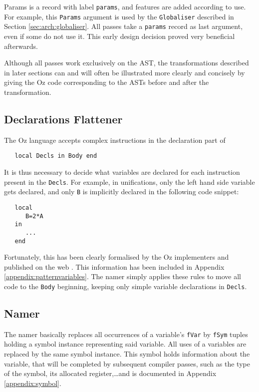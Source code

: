 \documentclass[a4paper]{memoir}
\begin{document}
Params is a record with label \lstinline!params!, and features are added
according to use. For example, this \lstinline!Params! argument is used by
the \lstinline!Globaliser! described in Section \ref{sec:arch:globaliser}. All
passes take a \lstinline!params! record as last argument, even if some do not use it. 
This early design decision proved very beneficial afterwards.


Although all passes work exclusively on the AST, the transformations described in later sections can and will often be illustrated more clearly and concisely by giving the Oz code corresponding to the ASTs before and after the transformation. 

\subsection{Declarations Flattener}\label{sec:arch:declsflattener}
The Oz language accepts complex instructions in the declaration part of
\begin{lstlisting}
   local Decls in Body end
\end{lstlisting}
 It is thus necessary to decide what variables are declared for each instruction present in the \lstinline!Decls!. 
For example, in unifications, only the left hand side variable gets declared,
and only \lstinline!B! is implicitly declared in the following code snippet:
\begin{lstlisting}
   local
      B=2*A
   in
      ...
   end
\end{lstlisting}
Fortunately, this has been clearly formalised by the Oz implementers and published on the web \cite{BaseLang}. This information has been included in Appendix \ref{appendix:patternvariables}. The namer simply applies these rules to move all code to the \lstinline!Body! beginning, keeping only simple variable declarations in \lstinline!Decls!.

\subsection{Namer}\label{sec:arch:namer}
The namer  basically replaces all occurrences of a variable's \lstinline!fVar! by \lstinline!fSym! tuples holding a symbol instance representing said variable. All uses of a variables are replaced by the same symbol instance. This symbol holds information about the variable, that will be completed by subsequent compiler passes, such as the type of the symbol, its allocated register,\ldots and is documented in Appendix \ref{appendix:symbol}.
\end{document}
